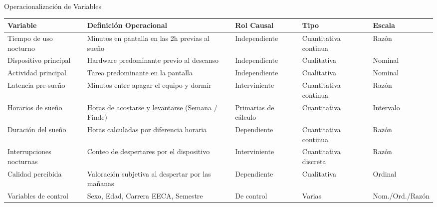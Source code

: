 \documentclass[10pt, aspectratio=169]{beamer}
\begin{document}
\begin{frame}{Operacionalización de Variables}
    \centering
    \tiny
    \begin{tabular}{p{2.8cm}p{3.2cm}lll}
        \toprule
        \textbf{Variable} & \textbf{Definición Operacional} & \textbf{Rol Causal} & \textbf{Tipo} & \textbf{Escala} \\
        \midrule
        Tiempo de uso nocturno & Minutos en pantalla en las 2h previas al sueño & Independiente & Cuantitativa continua & Razón \\
        Dispositivo principal & Hardware predominante previo al descanso & Independiente & Cualitativa & Nominal \\
        Actividad principal & Tarea predominante en la pantalla & Independiente & Cualitativa & Nominal \\
        Latencia pre-sueño & Minutos entre apagar el equipo y dormir & Interviniente & Cuantitativa continua & Razón \\
        Horarios de sueño & Horas de acostarse y levantarse (Semana / Finde) & Primarias de cálculo & Cuantitativa & Intervalo \\
        Duración del sueño & Horas calculadas por diferencia horaria & Dependiente & Cuantitativa continua & Razón \\
        Interrupciones nocturnas & Conteo de despertares por el dispositivo & Interviniente & Cuantitativa discreta & Razón \\
        Calidad percibida & Valoración subjetiva al despertar por las mañanas & Dependiente & Cualitativa & Ordinal \\
        Variables de control & Sexo, Edad, Carrera EECA, Semestre & De control & Varias & Nom./Ord./Razón \\
        \bottomrule
    \end{tabular}
\end{frame}
\end{document}
